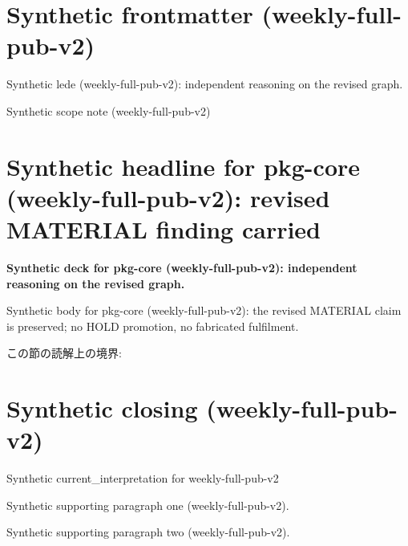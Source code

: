 \documentclass[lualatex,a4paper,10pt]{jlreq}
\begin{document}
\surveycover
\clearpage
\section*{Synthetic frontmatter (weekly-full-pub-v2)}
Synthetic lede (weekly-full-pub-v2): independent reasoning on the revised graph.

\begin{claimboundary}
\noindent Synthetic scope note (weekly-full-pub-v2)\par
\end{claimboundary}
\clearpage
\twocolumn
\section{Synthetic headline for pkg-core (weekly-full-pub-v2): revised MATERIAL finding carried}
\label{pkg:pkg-core}
\noindent\textbf{Synthetic deck for pkg-core (weekly-full-pub-v2): independent reasoning on the revised graph.} \cite{w2026-W33target-source}\par\medskip
\noindent Synthetic body for pkg-core (weekly-full-pub-v2): the revised MATERIAL claim is preserved; no HOLD promotion, no fabricated fulfilment.\par\medskip
\begin{claimboundary}
この節の読解上の境界: 
\end{claimboundary}
\clearpage
\onecolumn
\section{Synthetic closing (weekly-full-pub-v2)}
\label{sec:issue-summary}
\noindent Synthetic current\_interpretation for weekly-full-pub-v2\par\medskip
\noindent Synthetic supporting paragraph one (weekly-full-pub-v2).\par\medskip
\noindent Synthetic supporting paragraph two (weekly-full-pub-v2).\par\medskip
\clearpage
\onecolumn
\printbibliography[title={References / Source Notes}]
\end{document}
